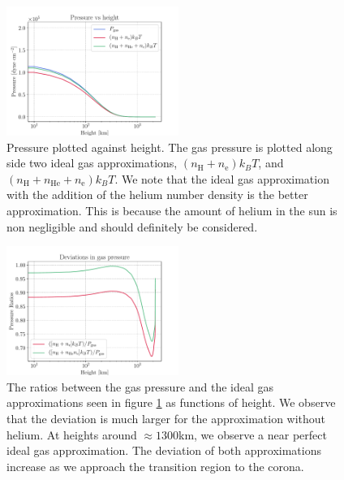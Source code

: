 \documentclass[a4paper,11.5pt,]{article}
\begin{document}
\begin{multicols}{2}
\begin{figure}[H]
    \centering
    \includegraphics[width = 0.5\textwidth]{figures/1.2/FALCgasPressure.pdf}
    \caption{Pressure plotted against height. The gas pressure is plotted along side two ideal gas approximations, $(n_\mathrm{H} + n_\mathrm{e})k_B T$, and $(n_\mathrm{H} + n_\mathrm{He} + n_\mathrm{e})k_B T$. We note that the ideal gas approximation with the addition of the helium number density is the better approximation. This is because the amount of helium in the sun is non negligible and should definitely be considered. }
    \label{fig: FALC p/h}
\end{figure}

\begin{figure}[H]
    \centering
    \includegraphics[width = 0.5\textwidth]{figures/1.2/FALCgasPressureDeviations.pdf}
    \caption{The ratios between the gas pressure and the ideal gas approximations seen in figure \ref{fig: FALC p/h} as functions of height. We observe that the deviation is much larger for the approximation without helium. At heights around $\approx 1300$km, we observe a near perfect ideal gas approximation. The deviation of both approximations increase as we approach the transition region to the corona. }
    \label{fig: FALC dev}
\end{figure}



\end{multicols}
\end{document}
